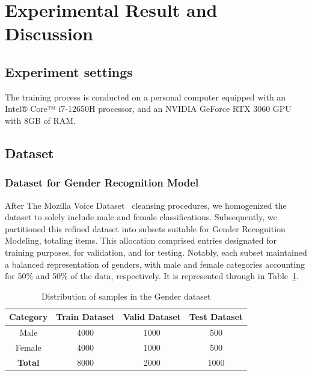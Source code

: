 \documentclass[conference, 10pt,onecolumn]{IEEEtran}
\begin{document}
\section{Experimental Result and Discussion}
\subsection{Experiment settings}

The training process is conducted on a personal computer equipped with an Intel® Core™ i7-12650H processor, and an NVIDIA GeForce RTX 3060 GPU with 8GB of RAM.
\subsection{Dataset}
\subsubsection{Dataset for Gender Recognition Model}

After The Mozilla Voice Dataset~\cite{mozilla_voice} cleansing procedures, we homogenized the dataset to solely include male and female classifications. Subsequently, we partitioned this refined dataset into subsets suitable for Gender Recognition Modeling, totaling %
items. This allocation comprised %
entries designated for training purposes, %
for validation, and %
for testing. Notably, each subset maintained a balanced representation of genders, with male and female categories accounting for 50\% and 50\% of the data, respectively. It is represented through in Table~\ref{tab:Distribution of samples in the Gender dataset}.

\begin{table}[htbp]
    \centering
    \begin{tabular}{|c|ccc|}
    \hline
    \textbf{Category} & \textbf{Train Dataset} & \textbf{Valid Dataset} & \textbf{Test Dataset}\\
    \hline
    Male & 4000 & 1000 & 500 \\
    Female & 4000 & 1000 & 500 \\
    \hline
    \textbf{Total} & 8000 & 2000 & 1000 \\
    \hline
    \end{tabular}
    \caption{Distribution of samples in the Gender dataset}
    \label{tab:Distribution of samples in the Gender dataset}
\end{table}
\end{document}
